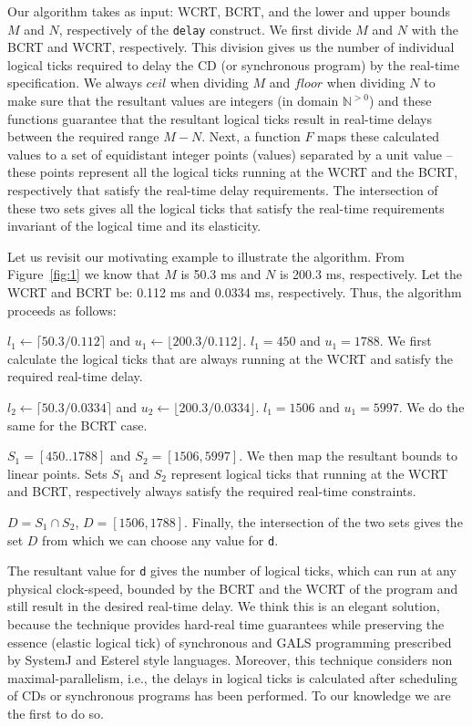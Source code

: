 Our algorithm takes as input: WCRT, BCRT, and the lower and upper bounds
$M$ and $N$, respectively of the \texttt{delay} construct. We first
divide $M$ and $N$ with the BCRT and WCRT, respectively. This division
gives us the number of individual logical ticks required to delay the CD
(or synchronous program) by the real-time specification. We always
$ceil$ when dividing $M$ and $floor$ when dividing $N$ to make sure that
the resultant values are integers (in domain $\mathbb{N}^{>0}$) and
these functions guarantee that the resultant logical ticks result in
real-time delays between the required range $M-N$. Next, a function $F$
maps these calculated values to a set of equidistant integer points
(values) separated by a unit value -- these points represent all the
logical ticks running at the WCRT and the BCRT, respectively that
satisfy the real-time delay requirements. The intersection of these two
sets gives all the logical ticks that satisfy the real-time requirements
invariant of the logical time and its elasticity.

Let us revisit our motivating example to illustrate the algorithm. From
Figure~\ref{fig:1} we know that $M$ is 50.3 ms and $N$ is 200.3 ms,
respectively. Let the WCRT and BCRT be: 0.112 ms and 0.0334 ms,
respectively. Thus, the algorithm proceeds as follows:

\begin{enumerate*}
\item $l_1 \leftarrow \lceil 50.3/0.112 \rceil$ and $u_1 \leftarrow
  \lfloor 200.3/0.112 \rfloor$. $l_1 = 450$ and $u_1 = 1788$. We first
  calculate the logical ticks that are always running at the WCRT and
  satisfy the required real-time delay.
\item $l_2 \leftarrow \lceil 50.3/0.0334 \rceil$ and $u_2 \leftarrow
  \lfloor 200.3/0.0334 \rfloor$. $l_1 = 1506$ and $u_1 = 5997$. We do
  the same for the BCRT case.
\item $S_1 = [450..1788]$ and $S_2 =[1506,5997]$. We then map the
  resultant bounds to linear points. Sets $S_1$ and $S_2$ represent
  logical ticks that running at the WCRT and BCRT, respectively always
  satisfy the required real-time constraints.
\item $D = S_1 \cap S_2$, $D = [1506,1788]$. Finally, the intersection
  of the two sets gives the set $D$ from which we can choose any value
  for \texttt{d}.
\end{enumerate*}

The resultant value for \texttt{d} gives the number of logical ticks,
which can run at any physical clock-speed, bounded by the BCRT and the
WCRT of the program and still result in the desired real-time delay. We
think this is an elegant solution, because the technique provides
hard-real time guarantees while preserving the essence (elastic logical
tick) of synchronous and GALS programming prescribed by SystemJ and
Esterel style languages. Moreover, this technique considers non
maximal-parallelism, i.e., the delays in logical ticks is calculated
after scheduling of CDs or synchronous programs has been performed. To
our knowledge we are the first to do so.

